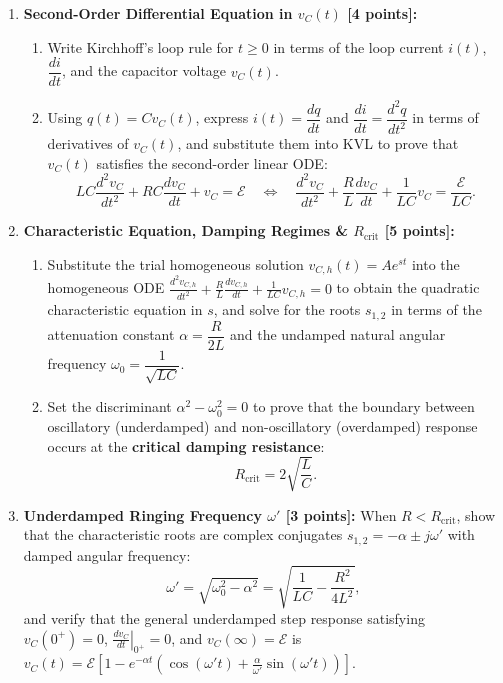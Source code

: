 \documentclass[10pt,letterpaper]{article}
\begin{document}
\begin{enumerate}
  \item \textbf{Second-Order Differential Equation in $v_C(t)$ [4 points]:}
    \begin{enumerate}
      \item Write Kirchhoff's loop rule for $t \ge 0$ in terms of the loop current $i(t)$, $\dfrac{di}{dt}$, and the capacitor voltage $v_C(t)$.
      \item Using $q(t) = C v_C(t)$, express $i(t) = \dfrac{dq}{dt}$ and $\dfrac{di}{dt} = \dfrac{d^2 q}{dt^2}$ in terms of derivatives of $v_C(t)$, and substitute them into KVL to prove that $v_C(t)$ satisfies the second-order linear ODE:
      $$LC\frac{d^2 v_C}{dt^2} + RC\frac{dv_C}{dt} + v_C = \mathcal{E} \quad \Longleftrightarrow \quad \frac{d^2 v_C}{dt^2} + \frac{R}{L}\frac{dv_C}{dt} + \frac{1}{LC}v_C = \frac{\mathcal{E}}{LC}.$$
    \end{enumerate}
  
  \item \textbf{Characteristic Equation, Damping Regimes \& $R_{\text{crit}}$ [5 points]:}
    \begin{enumerate}
      \item Substitute the trial homogeneous solution $v_{C,h}(t) = A e^{st}$ into the homogeneous ODE $\frac{d^2 v_{C,h}}{dt^2} + \frac{R}{L}\frac{dv_{C,h}}{dt} + \frac{1}{LC}v_{C,h} = 0$ to obtain the quadratic characteristic equation in $s$, and solve for the roots $s_{1,2}$ in terms of the attenuation constant $\alpha = \dfrac{R}{2L}$ and the undamped natural angular frequency $\omega_0 = \dfrac{1}{\sqrt{LC}}$.
      \item Set the discriminant $\alpha^2 - \omega_0^2 = 0$ to prove that the boundary between oscillatory (underdamped) and non-oscillatory (overdamped) response occurs at the \textbf{critical damping resistance}:
      $$R_{\text{crit}} = 2\sqrt{\frac{L}{C}}.$$
    \end{enumerate}
  
  \item \textbf{Underdamped Ringing Frequency $\omega'$ [3 points]:} When $R < R_{\text{crit}}$, show that the characteristic roots are complex conjugates $s_{1,2} = -\alpha \pm j\omega'$ with damped angular frequency:
  $$\omega' = \sqrt{\omega_0^2 - \alpha^2} = \sqrt{\frac{1}{LC} - \frac{R^2}{4L^2}},$$
  and verify that the general underdamped step response satisfying $v_C(0^+)=0$, $\left.\frac{dv_C}{dt}\right|_{0^+}=0$, and $v_C(\infty)=\mathcal{E}$ is $v_C(t) = \mathcal{E}\left[1 - e^{-\alpha t}\left(\cos(\omega' t) + \frac{\alpha}{\omega'}\sin(\omega' t)\right)\right]$.
\end{enumerate}
\vspace{1.2in}
\end{document}
